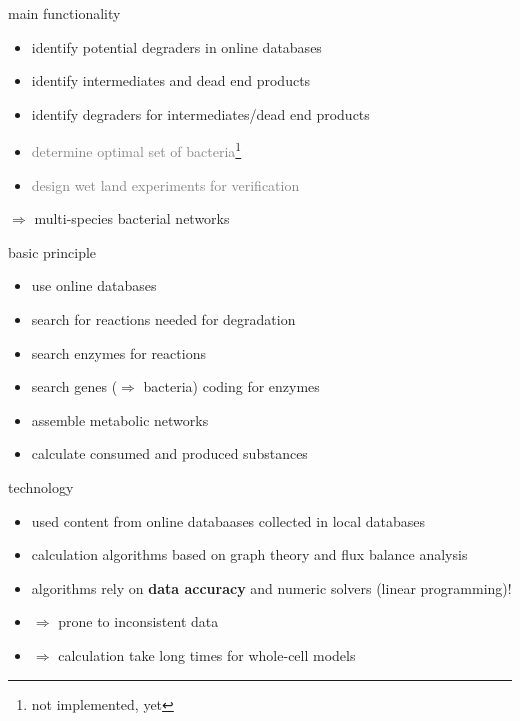 \documentclass[style=aggie]{powerdot}
\begin{document}
\begin{slide}{main functionality}
\begin{itemize}
 \item identify potential degraders in online databases\newline
 \item identify intermediates and dead end products\newline
 \item identify degraders for intermediates/dead end products\newline
 \item \textcolor{gray}{determine optimal set of bacteria\footnote{not implemented, yet}}\newline
 \item \textcolor{gray}{design wet land experiments for verification\footnotemark[1]}
\end{itemize}
\indent $\Rightarrow$ multi-species bacterial networks
\end{slide}

\begin{slide}{basic principle}
\begin{itemize}
 \item use online databases\newline
 \item search for reactions needed for degradation\newline
 \item search enzymes for reactions\newline
 \item search genes ($\Rightarrow$ bacteria) coding for enzymes\newline
 \item assemble metabolic networks\newline
 \item calculate consumed and produced substances
\end{itemize}
\end{slide}

\begin{slide}{technology}
\begin{itemize}
 \item used content from online databaases collected in local databases\newline
 \item calculation algorithms based on graph theory and flux balance analysis\newline
 \item algorithms rely on \textbf{data accuracy} and numeric solvers (linear programming)!\newline
 \item $\Rightarrow$ prone to inconsistent data\newline
 \item $\Rightarrow$ calculation take long times for whole-cell models
\end{itemize}

\end{slide}
\end{document}

